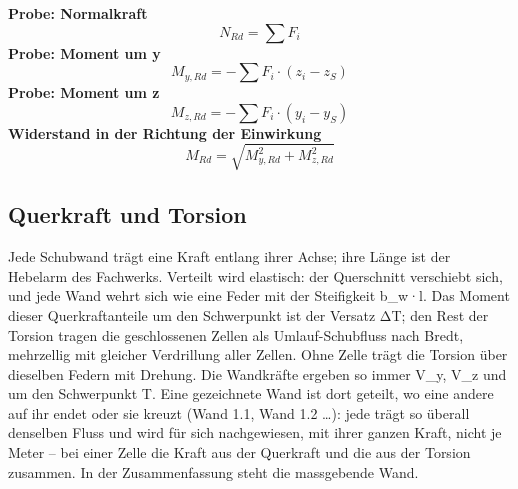 \documentclass[11pt,a4paper]{article}
\begin{document}
\noindent\textbf{Probe: Normalkraft}
\begin{equation*}
N_{Rd} = \sum F_i
\end{equation*}
\noindent\textbf{Probe: Moment um y}
\begin{equation*}
M_{y,Rd} = -\sum F_i \cdot (z_i - z_S)
\end{equation*}
\noindent\textbf{Probe: Moment um z}
\begin{equation*}
M_{z,Rd} = -\sum F_i \cdot (y_i - y_S)
\end{equation*}
\noindent\textbf{Widerstand in der Richtung der Einwirkung}
\begin{equation*}
M_{Rd} = \sqrt{M_{y,Rd}^{2} + M_{z,Rd}^{2}}
\end{equation*}
\subsection{Querkraft und Torsion}
Jede Schubwand trägt eine Kraft entlang ihrer Achse; ihre Länge ist der Hebelarm des Fachwerks. Verteilt wird elastisch: der Querschnitt verschiebt sich, und jede Wand wehrt sich wie eine Feder mit der Steifigkeit b\_w·l. Das Moment dieser Querkraftanteile um den Schwerpunkt ist der Versatz ΔT; den Rest der Torsion tragen die geschlossenen Zellen als Umlauf-Schubfluss nach Bredt, mehrzellig mit gleicher Verdrillung aller Zellen. Ohne Zelle trägt die Torsion über dieselben Federn mit Drehung. Die Wandkräfte ergeben so immer V\_y, V\_z und um den Schwerpunkt T. Eine gezeichnete Wand ist dort geteilt, wo eine andere auf ihr endet oder sie kreuzt (Wand 1.1, Wand 1.2 …): jede trägt so überall denselben Fluss und wird für sich nachgewiesen, mit ihrer ganzen Kraft, nicht je Meter – bei einer Zelle die Kraft aus der Querkraft und die aus der Torsion zusammen. In der Zusammenfassung steht die massgebende Wand.
\end{document}
